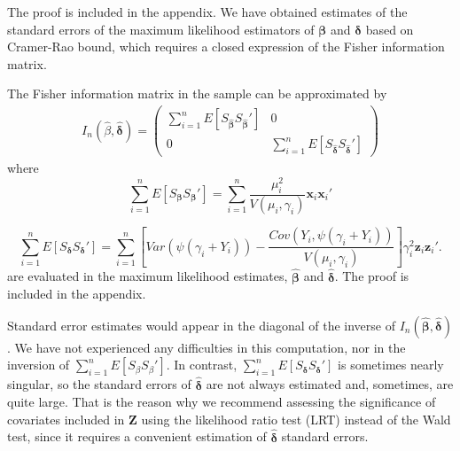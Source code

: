 The proof is included in the appendix. We have obtained estimates of the standard errors of the maximum likelihood estimators of $\boldsymbol{\beta}$ and $\boldsymbol{\delta}$ based on Cramer-Rao bound, which requires a closed expression of the Fisher information matrix. %
\begin{res}\label{inf_mat}
The Fisher information matrix in the sample can be approximated by
\begin{align*}
    I_n\left(\hat{\beta},\widehat{\boldsymbol{\delta}}\right) = \left(
    \begin{array}{c|c}
    \displaystyle{\sum_{i=1}^n} E\left[S_{\widehat{\boldsymbol{\beta}}}S_{\widehat{\boldsymbol{\beta}}}'\right] & 0 \\
    \hline
    0 & \displaystyle{\sum_{i=1}^n} E\left[S_{\widehat{\boldsymbol{\delta}}}S_{\widehat{\boldsymbol{\delta}}}'\right]
\end{array}
    \right)
\end{align*}
where
\[
\sum_{i=1}^n E\left[S_{\boldsymbol{\beta}}S_{\boldsymbol{\beta}}'\right] = \sum_{i=1}^n \frac{\mu_i^2}{V\left(\mu_i,\gamma_i\right)} \mathbf{x}_i \mathbf{x}_i'
\]

\[
\sum_{i=1}^n E\left[S_{\boldsymbol{\delta}}S_{\boldsymbol{\delta}}'\right] = \sum_{i=1}^n \left[ Var\left(\psi\left(\gamma_i + Y_i\right)\right) - \frac{Cov\left(Y_i, \psi\left(\gamma_i + Y_i\right)\right)}{V\left(\mu_i,\gamma_i\right)} \right] \gamma_i^2 \mathbf{z}_i \mathbf{z}_i'.
\]
are evaluated in the maximum likelihood estimates, $\widehat{\boldsymbol{\beta}}$ and $\widehat{\boldsymbol{\delta}}$. The proof is included in the appendix.
\end{res}

Standard error estimates would appear in the diagonal of the inverse of $I_n\left(\widehat{\boldsymbol{\beta}},\widehat{\boldsymbol{\delta}}\right)$. We have not experienced any difficulties in this computation, nor in the inversion of $\sum_{i=1}^n E\left[S_{\beta}S_{\beta}'\right]$. In contrast, $\sum_{i=1}^n E\left[S_{\boldsymbol{\delta}}S_{\boldsymbol{\delta}}'\right]$ is sometimes nearly singular, so the standard errors of $\widehat{\boldsymbol{\delta}}$ are not always estimated and, sometimes, are quite large. That is the reason why we recommend assessing the significance of covariates included in $\mathbf{Z}$ using the likelihood ratio test (LRT) instead of the Wald test, since it requires a convenient estimation of $\widehat{\boldsymbol{\delta}}$ standard errors.

